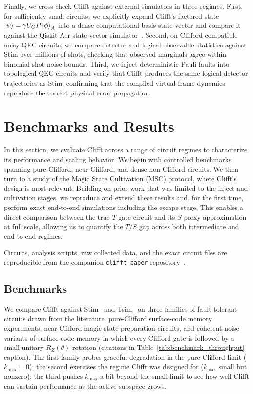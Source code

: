 \documentclass[a4paper, onecolumn, unpublished]{quantumarticle}
\begin{document}
    Finally, we cross-check Clifft against external simulators in three regimes. First, for sufficiently small circuits, we explicitly expand Clifft's factored state $\ket{\psi}=\gamma U_C \tilde{P}\ket{\phi}_A$ into a dense computational-basis state vector and compare it against the Qiskit Aer state-vector simulator~\cite{qiskit2024}. Second, on Clifford-compatible noisy QEC circuits, we compare detector and logical-observable statistics against Stim over millions of shots, checking that observed marginals agree within binomial shot-noise bounds. Third, we inject deterministic Pauli faults into topological QEC circuits and verify that Clifft produces the same logical detector trajectories as Stim, confirming that the compiled virtual-frame dynamics reproduce the correct physical error propagation.

    \section{Benchmarks and Results}
    \label{sec:results}

    In this section, we evaluate Clifft across a range of circuit regimes to characterize its performance and scaling behavior. We begin with controlled benchmarks spanning pure-Clifford, near-Clifford, and dense non-Clifford circuits. We then turn to a study of the Magic State Cultivation (MSC) protocol, where Clifft's design is most relevant. Building on prior work that was limited to the inject and cultivation stages, we reproduce and extend these results and, for the first time, perform exact end-to-end simulations including the escape stage. This enables a direct comparison between the true $T$-gate circuit and its $S$-proxy approximation at full scale, allowing us to quantify the $T/S$ gap across both intermediate and end-to-end regimes.

    Circuits, analysis scripts, raw collected data, and the exact circuit files are reproducible from the companion \texttt{clifft-paper} repository~\cite{clifftPaperRepo}.

    \subsection{Benchmarks}
    \label{sec:results_qec}

    We compare Clifft against Stim~\cite{gidneyStimFastStabilizer2021} and Tsim~\cite{haenelTsimFastUniversal2026} on three families of fault-tolerant circuits drawn from the literature: pure-Clifford surface-code memory experiments, near-Clifford magic-state preparation circuits, and coherent-noise variants of surface-code memory in which every Clifford gate is followed by a small unitary $R_Z(\theta)$ rotation (citations in Table~\ref{tab:benchmark_throughput} caption). The first family probes graceful degradation in the pure-Clifford limit ($k_{\max}=0$); the second exercises the regime Clifft was designed for ($k_{\max}$ small but nonzero); the third pushes $k_{\max}$ a bit beyond the small limit to see how well Clifft can sustain performance as the active subspace grows.
\end{document}
